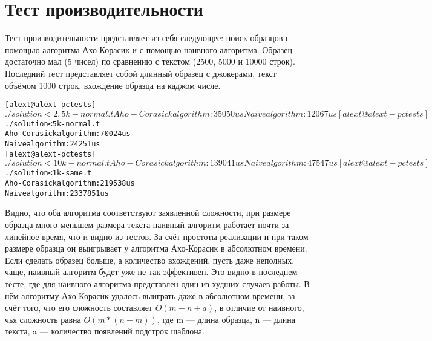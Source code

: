 \section{Тест производительности}

Тест производительности представляет из себя следующее: поиск образцов с помощью алгоритма Ахо-Корасик и с помощью наивного алгоритма. Образец достаточно мал (5 чисел) по сравнению с текстом (2500, 5000 и 10000 строк). Последний тест представляет собой длинный образец с джокерами, текст объёмом 1000 строк, вхождение образца на каджом числе.

\begin{alltt}
[alext@alext-pc tests]$ ./solution < 2,5k-normal.t 
Aho-Corasick algorithm: 35050us
Naive algorithm: 12067us
[alext@alext-pc tests]$ ./solution < 5k-normal.t 
Aho-Corasick algorithm: 70024us
Naive algorithm: 24251us
[alext@alext-pc tests]$ ./solution < 10k-normal.t 
Aho-Corasick algorithm: 139041us
Naive algorithm: 47547us
[alext@alext-pc tests]$ ./solution < 1k-same.t
Aho-Corasick algorithm: 219538us
Naive algorithm: 2337851us
\end{alltt}

Видно, что оба алгоритма соответствуют заявленной сложности, при размере образца много меньшем размера текста наивный алгоритм работает почти за линейное время, что и видно из тестов. За счёт простоты реализации и при таком размере образца он выигрывает у алгоритма Ахо-Корасик в абсолютном времени. Если сделать образец больше, а количество вхождений, пусть даже неполных, чаще, наивный алгоритм будет уже не так эффективен. Это видно в последнем тесте, где для наивного алгоритма представлен один из худших случаев работы. В нём алгоритму Ахо-Корасик удалось выиграть даже в абсолютном времени, за счёт того, что его сложность составляет $O(m + n + a)$, в отличие от наивного, чья сложность равна $O(m*(n - m))$, где m --- длина образца, n --- длина текста, a --- количество появлений подстрок шаблона.

\pagebreak

